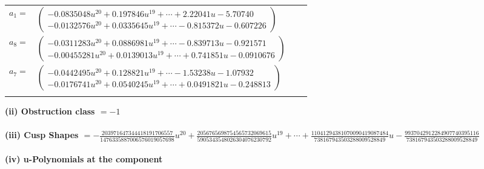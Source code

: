 \documentclass[1p]{elsarticle_modified}
\theoremstyle{definition}
\begin{document}
\begin{tabular}{m{7pt} m{180pt} m{7pt} m{180pt} }
\flushright $a_{1}=$&$\begin{pmatrix}-0.0835048 u^{20}+0.197846 u^{19}+\cdots+2.22041 u-5.70740\\-0.0132576 u^{20}+0.0335645 u^{19}+\cdots-0.815372 u-0.607226\end{pmatrix}$ \\
\flushright $a_{8}=$&$\begin{pmatrix}-0.0311283 u^{20}+0.0886981 u^{19}+\cdots-0.839713 u-0.921571\\-0.00455281 u^{20}+0.0139013 u^{19}+\cdots+0.741851 u-0.0910676\end{pmatrix}$ \\
\flushright $a_{7}=$&$\begin{pmatrix}-0.0442495 u^{20}+0.128821 u^{19}+\cdots-1.53238 u-1.07932\\-0.0176741 u^{20}+0.0540245 u^{19}+\cdots+0.0491821 u-0.248813\end{pmatrix}$\\&\end{tabular}
\flushleft \textbf{(ii) Obstruction class $= -1$}\\~\\
\flushleft \textbf{(iii) Cusp Shapes $= -\frac{203971647344418191706557}{1476335887006576019057698} u^{20}+\frac{2056765698754565732069615}{5905343548026304076230792} u^{19}+\cdots+\frac{11041294381070090419087484}{738167943503288009528849} u-\frac{9937042912284907740395116}{738167943503288009528849}$}\\~\\
\newpage\renewcommand{\arraystretch}{1}
\flushleft \textbf{(iv) u-Polynomials at the component}\newline \\
\end{document}
